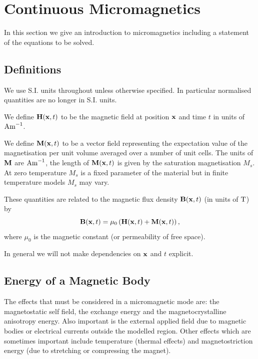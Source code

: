 \chapter{Continuous Micromagnetics}
\label{sec:cont-micromag}

In this section we give an introduction to micromagnetics including a statement of the equations to be solved.

\section{Definitions}
We use S.I. units throughout unless otherwise specified. In particular normalised quantities are no longer in S.I. units.

We define $\mathbf{H}(\mathbf{x},t)$ to be the magnetic field at position $\mathbf{x}$ and time $t$ in units of ${\text{Am}^{-1}}$.

We define $\mathbf{M}(\mathbf{x},t)$ to be a vector field representing the expectation value of the magnetisation per unit volume averaged over a number of unit cells.\cite{Aharoni1996}
The units of $\mathbf{M}$ are ${\text{Am}^{-1}}$, the length of $\mathbf{M}(\mathbf{x},t)$ is given by the saturation magnetisation $M_s$.
At zero temperature $M_s$ is a fixed parameter of the material but in finite temperature models $M_s$ may vary.

These quantities are related to the magnetic flux density $\mathbf{B}(\mathbf{x},t)$ (in units of ${\text{T}}$) by
\begin{equation}
  \label{eq:37}
  \mathbf{B}(\mathbf{x},t) = \mu_0 \left( \mathbf{H}(\mathbf{x},t) + \mathbf{M}(\mathbf{x},t) \right),
\end{equation}
where $\mu_0$ is the magnetic constant (or permeability of free space).

In general we will not make dependencies on $\mathbf{x}$ and $t$ explicit.

\section{Energy of a Magnetic Body}
\label{sec:energy-magnetic-body}

The effects that must be considered in a micromagnetic mode are: the magnetostatic self field, the exchange energy and the magnetocrystalline anisotropy energy. Also important is the external applied field due to magnetic bodies or electrical currents outside the modelled region. Other effects which are sometimes important include temperature (thermal effects) and magnetostriction energy (due to stretching or compressing the magnet).


